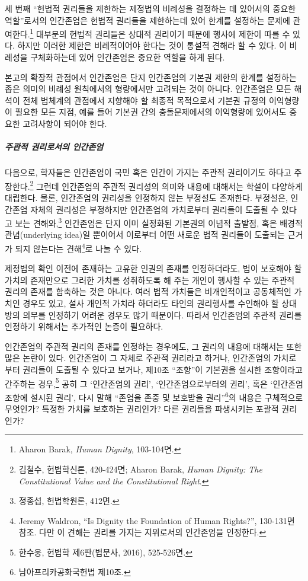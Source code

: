 세 번째 ``헌법적 권리들을 제한하는 제정법의 비례성을 결정하는 데 있어서의 중요한 역할''로서의 인간존엄은 헌법적 권리들을 제한하는데 있어 한계를 설정하는 문제에 관여한다.\footnote{Aharon Barak, \emph{Human Dignity}, 103-104면.} 대부분의 헌법적 권리들은 상대적 권리이기 때문에 행사에 제한이 따를 수 있다. 하지만 이러한 제한은 비례적이어야 한다는 것이 통설적 견해라 할 수 있다. 이 비례성을 구체화하는데 있어 인간존엄은 중요한 역할을 하게 된다.

본고의 확장적 관점에서 인간존엄은 단지 인간존엄의 기본권 제한의 한계를 설정하는 좁은 의미의 비례성 원칙에서의 형량에서만 고려되는 것이 아니다. 인간존엄은 모든 해석이 전체 법체계의 관점에서 지향해야 할 최종적 목적으로서 기본권 규정의 이익형량이 필요한 모든 지점, 예를 들어 기본권 간의 충돌문제에서의 이익형량에 있어서도 중요한 고려사항이 되어야 한다.

\subparagraph{주관적 권리로서의 인간존엄}

다음으로, 학자들은 인간존엄이 국민 혹은 인간이 가지는 주관적 권리이기도 하다고 주장한다.\footnote{김철수, 헌법학신론, 420-424면; Aharon Barak, \emph{Human Dignity: The Constitutional Value and the Constitutional Right}.} 그런데 인간존엄의 주관적 권리성의 의미와 내용에 대해서는 학설이 다양하게 대립한다. 물론, 인간존엄의 권리성을 인정하지 않는 부정설도 존재한다. 부정설은, 인간존엄 자체의 권리성은 부정하지만 인간존엄의 가치로부터 권리들이 도출될 수 있다고 보는 견해와,\footnote{정종섭, 헌법학원론, 412면.} 인간존엄은 단지 이미 실정화된 기본권의 이념적 출발점, 혹은 배경적 관념(underlying idea)일 뿐이어서 이로부터 어떤 새로운 법적 권리들이 도출되는 근거가 되지 않는다는 견해\footnote{Jeremy Waldron, ``Is Dignity the Foundation of Human Rights?'', 130-131면 참조. 다만 이 견해는 권리를 가지는 지위로서의 인간존엄을 인정한다.}로 나눌 수 있다.

제정법의 확인 이전에 존재하는 고유한 인권의 존재를 인정하더라도, 법이 보호해야 할 가치의 존재만으로 그러한 가치를 성취하도록 해 주는 개인이 행사할 수 있는 주관적 권리의 존재를 함축하는 것은 아니다. 여러 법적 가치들은 비개인적이고 공동체적인 가치인 경우도 있고, 설사 개인적 가치라 하더라도 타인의 권리행사를 수인해야 할 상대방의 의무를 인정하기 어려운 경우도 많기 때문이다. 따라서 인간존엄의 주관적 권리를 인정하기 위해서는 추가적인 논증이 필요하다.

인간존엄의 주관적 권리의 존재를 인정하는 경우에도, 그 권리의 내용에 대해서는 또한 많은 논란이 있다. 인간존엄이 그 자체로 주관적 권리라고 하거나, 인간존엄의 가치로부터 권리들이 도출될 수 있다고 보거나, 제10조 ``조항''이 기본권을 설시한 조항이라고 간주하는 경우,\footnote{한수웅, 헌법학 제6판(법문사, 2016), 525-526면.} 공히 그 `인간존엄의 권리', `인간존엄으로부터의 권리', 혹은 `인간존엄조항에 설시된 권리', 다시 말해 ``존엄을 존중 및 보호받을 권리''\footnote{남아프리카공화국헌법 제10조.}의 내용은 구체적으로 무엇인가? 특정한 가치를 보호하는 권리인가? 다른 권리들을 파생시키는 포괄적 권리인가?

